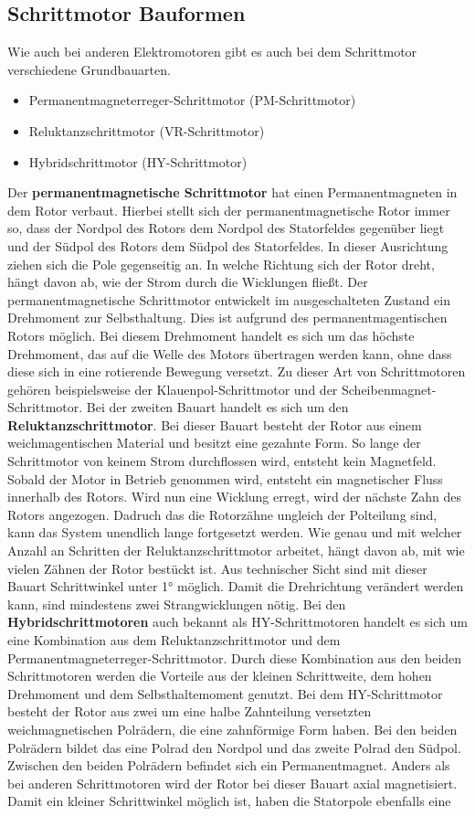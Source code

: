 \subsection{Schrittmotor Bauformen}
Wie auch bei anderen Elektromotoren gibt es auch bei dem Schrittmotor verschiedene Grundbauarten. 
\begin{itemize}
	\item {Permanentmagneterreger-Schrittmotor (PM-Schrittmotor)}
	\item {Reluktanzschrittmotor (VR-Schrittmotor)}
	\item {Hybridschrittmotor (HY-Schrittmotor)}
\end{itemize}
Der \textbf{permanentmagnetische Schrittmotor} hat einen Permanentmagneten in dem Rotor verbaut. Hierbei stellt sich der permanentmagnetische Rotor immer so, dass der Nordpol des Rotors dem Nordpol des Statorfeldes gegenüber liegt und der Südpol des Rotors dem Südpol des Statorfeldes. In dieser Ausrichtung ziehen sich die Pole gegenseitig an. In welche Richtung sich der Rotor dreht, hängt davon ab, wie der Strom durch die Wicklungen fließt. Der permanentmagnetische Schrittmotor entwickelt im ausgeschalteten Zustand ein Drehmoment zur Selbsthaltung. Dies ist aufgrund des permanentmagentischen Rotors möglich. Bei diesem Drehmoment handelt es sich um das höchste Drehmoment, das auf die Welle des Motors übertragen werden kann, ohne dass diese sich in eine rotierende Bewegung versetzt. Zu dieser Art von Schrittmotoren gehören beispielsweise der Klauenpol-Schrittmotor und der Scheibenmagnet-Schrittmotor. Bei der zweiten Bauart handelt es sich um den \textbf{Reluktanzschrittmotor}. Bei dieser Bauart besteht der Rotor aus einem weichmagentischen Material und besitzt eine gezahnte Form. So lange der Schrittmotor von keinem Strom durchflossen wird, entsteht kein Magnetfeld. Sobald der Motor in Betrieb genommen wird, entsteht ein magnetischer Fluss innerhalb des Rotors. Wird nun eine Wicklung erregt, wird der nächste Zahn des Rotors angezogen. Dadruch das die Rotorzähne ungleich der Polteilung sind, kann das System unendlich lange fortgesetzt werden. Wie genau und mit welcher Anzahl an Schritten der Reluktanzschrittmotor arbeitet, hängt davon ab, mit wie vielen Zähnen der Rotor bestückt ist. Aus technischer Sicht sind mit dieser Bauart Schrittwinkel unter 1° möglich. Damit die Drehrichtung verändert werden kann, sind mindestens zwei Strangwicklungen nötig. Bei den \textbf{Hybridschrittmotoren} auch bekannt als HY-Schrittmotoren handelt es sich um eine Kombination aus dem Reluktanzschrittmotor und dem Permanentmagneterreger-Schrittmotor. Durch diese Kombination aus den beiden Schrittmotoren werden die Vorteile aus der kleinen Schrittweite, dem hohen Drehmoment und dem Selbsthaltemoment genutzt. Bei dem HY-Schrittmotor besteht der Rotor aus zwei um eine halbe Zahnteilung versetzten weichmagnetischen Polrädern, die eine zahnförmige Form haben. Bei den beiden Polrädern bildet das eine Polrad den Nordpol und das zweite Polrad den Südpol. Zwischen den beiden Polrädern befindet sich ein Permanentmagnet. Anders als bei anderen Schrittmotoren wird der Rotor bei dieser Bauart axial magnetisiert. Damit ein kleiner Schrittwinkel möglich ist, haben die Statorpole ebenfalls eine 